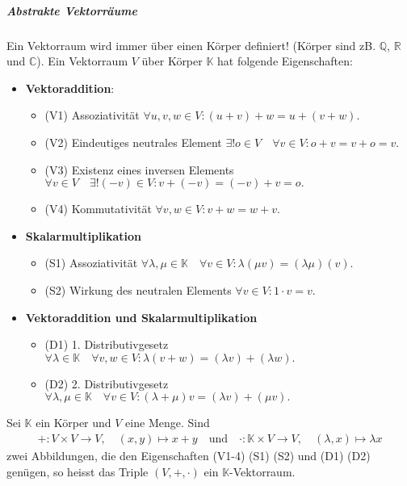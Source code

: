 \documentclass[12pt]{article}
\begin{document}
\vspace{1cm}
\subparagraph{\large Abstrakte Vektorräume}
\normalsize
\begin{flushleft}
    Ein Vektorraum wird immer über einen Körper definiert! (Körper sind zB. $\mathbb{Q}$, $\mathbb{R}$ und $\mathbb{C}$).
    Ein Vektorraum $V$ über Körper $\mathbb{K}$ hat folgende Eigenschaften:
    \begin{itemize}
        \item \textbf{Vektoraddition}:
        \begin{itemize}
            \item (V1) Assoziativität $\forall u,v,w \in V: (u + v) + w = u + (v + w).$
            \item (V2) Eindeutiges neutrales Element $\exists ! o \in V\quad \forall v \in V: o + v = v + o = v.$
            \item (V3) Existenz eines inversen Elements $\forall v \in V\quad \exists !(-v)\in V: v + (-v) = (-v) + v = o.$
            \item (V4) Kommutativität $\forall v,w \in V: v + w = w + v.$
        \end{itemize}
        \item \textbf{Skalarmultiplikation}
        \begin{itemize}
            \item (S1) Assoziativität $\forall \lambda , \mu \in \mathbb{K}\quad \forall v \in V: \lambda(\mu v) = (\lambda \mu)(v).$
            \item (S2) Wirkung des neutralen Elements $\forall v \in V: 1 \cdot v = v.$
        \end{itemize}
        \item \textbf{Vektoraddition und Skalarmultiplikation}
        \begin{itemize}
            \item (D1) 1. Distributivgesetz $\forall \lambda \in \mathbb{K}\quad \forall v,w \in V: \lambda(v + w) = (\lambda v) + (\lambda w).$
            \item (D2) 2. Distributivgesetz $\forall \lambda , \mu \in \mathbb{K}\quad \forall v \in V: (\lambda + \mu)v = (\lambda v) + (\mu v).$
        \end{itemize}
    \end{itemize}
    Sei $\mathbb{K}$ ein Körper und $V$ eine Menge. Sind \begin{align}
        +: V \times V \rightarrow V, \quad (x,y) \mapsto x + y \quad \text{und} \quad \cdot: \mathbb{K} \times V \to V, \quad (\lambda,x) \mapsto \lambda x
    \end{align}
    zwei Abbildungen, die den Eigenschaften (V1-4) (S1) (S2) und (D1) (D2) genügen, so heisst das Triple $(V,+,\cdot)$ ein $\mathbb{K}$-Vektorraum.
\end{flushleft}
\end{document}
